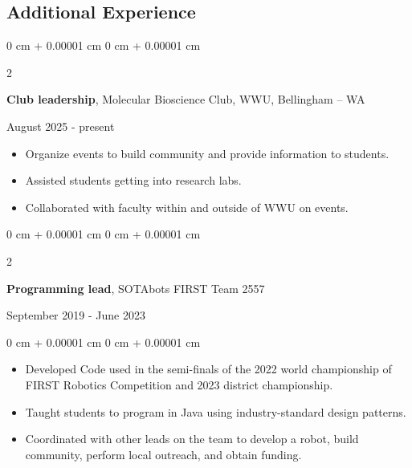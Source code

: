 \documentclass[10pt, article]{article}
\newenvironment{highlights}{
    \begin{itemize}[
        topsep=0.10 cm,
        parsep=0.10 cm,
        partopsep=0pt,
        itemsep=0pt,
        leftmargin=0 cm + 10pt
    ]
}{
    \end{itemize}
} %
\newenvironment{onecolentry}{
    \begin{adjustwidth}{
        0 cm + 0.00001 cm
    }{
        0 cm + 0.00001 cm
    }
}{
    \end{adjustwidth}
} %
\newenvironment{twocolentry}[2][]{
    \onecolentry
    \def\secondColumn{#2}
    \setcolumnwidth{\fill, 4.5 cm}
    \begin{paracol}{2}
}{
    \switchcolumn \raggedleft \secondColumn
    \end{paracol}
    \endonecolentry
} %
\begin{document}
    \begin{samepage}
    \section{Additional Experience}
       
      \begin{twocolentry}
        {August 2025 - present}
        \textbf {Club leadership}, Molecular Bioscience Club, WWU, Bellingham -- WA
      \end{twocolentry}
        \begin{highlights}
        \item Organize events to build community and provide information to students.
        \item Assisted students getting into research labs.
        \item Collaborated with faculty within and outside of WWU on events.

            \end{highlights}

      \begin{twocolentry}
        {September 2019 - June 2023}
        \textbf {Programming lead}, SOTAbots FIRST Team 2557


      \end{twocolentry}
      \begin{onecolentry}
        \begin{highlights}
      \item Developed Code used in the semi-finals of the 2022 world championship of FIRST Robotics Competition and 2023 district championship.
      \item Taught students to program in Java using industry-standard design patterns.
      \item Coordinated with other leads on the team to develop a robot, build community, perform local outreach, and obtain funding.

        \end{highlights}
      \end{onecolentry}

    \end{samepage}
\end{document}
